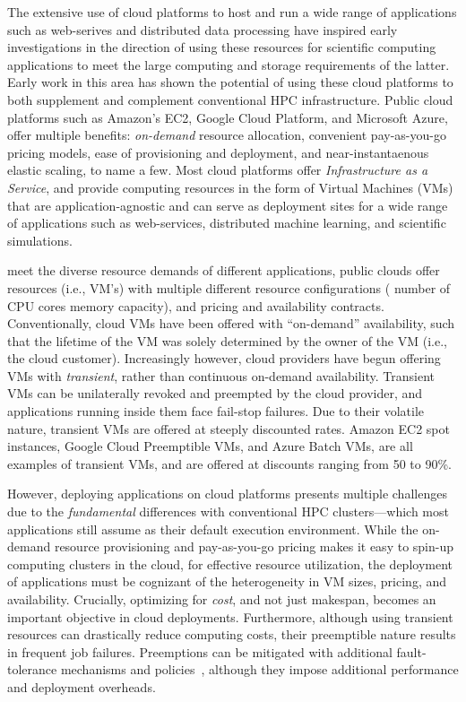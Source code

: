 \vikram
{
The extensive use of cloud platforms to host and run a wide range of applications such as web-serives and distributed data processing have inspired early investigations in the direction of using these resources for scientific computing applications to meet the large computing and storage requirements of the latter. Early work in this area has shown the potential of using these cloud platforms to both supplement and complement conventional HPC infrastructure. Public cloud platforms such as Amazon's EC2, Google Cloud Platform, and Microsoft Azure, offer multiple benefits: \emph{on-demand} resource allocation, convenient pay-as-you-go pricing models, ease of provisioning and deployment, and near-instantaenous elastic scaling, to name a few. Most cloud platforms offer \emph{Infrastructure as a Service}, and provide computing resources in the form of Virtual Machines (VMs) that are application-agnostic and can serve as deployment sites for a wide range of applications such as web-services, distributed machine learning, and scientific simulations. 
}


 meet the diverse resource demands of different applications, public clouds offer resources (i.e., VM's) with multiple different resource configurations ( number of CPU cores memory capacity), and pricing and availability contracts. 
Conventionally, cloud VMs have been offered with ``on-demand'' availability, such that the lifetime of the VM was solely determined by the owner of the VM (i.e., the cloud customer). 
Increasingly however, cloud providers have begun offering VMs with \emph{transient}, rather than continuous on-demand availability. 
Transient VMs can be unilaterally revoked and preempted by the cloud provider, and applications running inside them face fail-stop failures. 
Due to their volatile nature, transient VMs are offered at steeply discounted rates. Amazon EC2 spot instances, Google Cloud Preemptible VMs, and Azure Batch VMs, are all examples of transient VMs, and are offered at discounts ranging from 50 to 90\%.  


However, deploying applications on cloud platforms presents multiple challenges due to the  \emph{fundamental} differences with conventional HPC clusters---which most applications still assume as their default execution environment. 
%
While the on-demand resource provisioning and pay-as-you-go pricing makes it easy to spin-up computing clusters in the cloud, for effective resource utilization, the deployment of applications must be cognizant of the heterogeneity in VM sizes, pricing, and availability.
%
Crucially, optimizing for \emph{cost}, and not just makespan, becomes an important objective in cloud deployments. 
% 
Furthermore, although using transient resources can drastically reduce computing costs, their preemptible nature results in frequent job failures.
%
Preemptions can be mitigated with additional fault-tolerance mechanisms and policies~\cite{flint, marathe2014exploiting}, although they impose additional performance and deployment overheads. 


